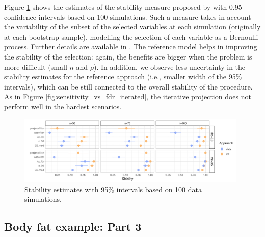 \documentclass[a4]{article}
\theoremstyle{definition}
\begin{document}
Figure \ref{fig:stability_iterated} shows the estimates of the stability
measure proposed by \cite{paper:stability} with 0.95 confidence
intervals based on 100 simulations. Such a measure takes in account
the variability of the subset of the selected variables at each
simulation (originally at each bootstrap sample), modelling the
selection of each variable as a Bernoulli process. Further details are
available in \cite{paper:stability}. The reference model helps in
improving the stability of the selection: again, the benefits are
bigger when the problem is more difficult (small $n$ and $\rho$). In
addition, we observe less uncertainty in the stability estimates for
the reference approach (i.e., smaller width of the 95\% intervals),
which can be still connected to the overall stability of the
procedure. As in Figure \ref{fig:sensitivity_vs_fdr_iterated}, the iterative
projection does not perform well in the hardest scenarios. 

\begin{figure}[tp]
  \centering
  \includegraphics[width=0.98\textwidth]{graphics/stability_iterated.pdf}
  \caption{Stability estimates with 95\% intervals based on 100 data simulations.\\}
  \label{fig:stability_iterated}
\end{figure}


\hypertarget{bodyfat-2}{%
\subsection{Body fat example: Part 3}\label{bodyfat-3}}
\end{document}
